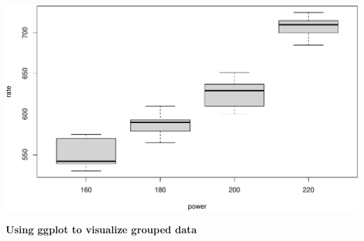 \documentclass[
  letterpaper,
]{scrbook}
\begin{document}
\includegraphics{unit5-factor/crbd_files/figure-pdf/unnamed-chunk-1-1.pdf}

\textbf{Using ggplot to visualize grouped data}
\end{document}
